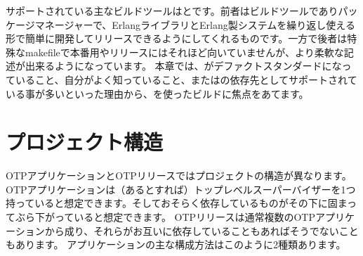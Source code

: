 サポートされている主なビルドツールはとです。前者はビルドツールでありパッケージマネージャーで、ErlangライブラリとErlang製システムを繰り返し使える形で簡単に開発してリリースできるようにしてくれるものです。一方で後者は特殊なmakefileで本番用やリリースにはそれほど向いていませんが、より柔軟な記述が出来るようになっています。
本章では、がデファクトスタンダードになっていること、自分がよく知っていること、またはの依存先としてサポートされている事が多いといった理由から、を使ったビルドに焦点をあてます。

\section{プロジェクト構造}
\label{sec:project-structure}

OTPアプリケーションとOTPリリースではプロジェクトの構造が異なります。OTPアプリケーションは（あるとすれば）トップレベルスーパーバイザーを1つ持っていると想定できます。そしておそらく依存しているものがその下に固まってぶら下がっていると想定できます。
OTPリリースは通常複数のOTPアプリケーションから成り、それらがお互いに依存していることもあればそうでないこともあります。
アプリケーションの主な構成方法はこのように2種類あります。

